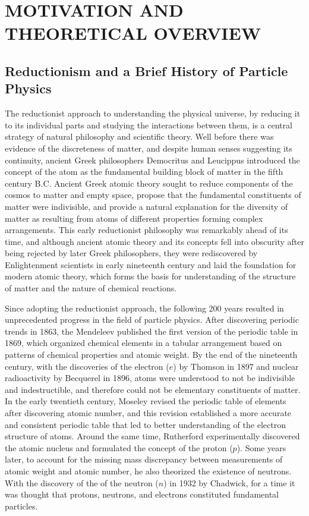 
\chapter{MOTIVATION AND THEORETICAL OVERVIEW}
\label{Motivation_and_Theoretical_Overview}

\section{Reductionism and a Brief History of Particle Physics}
The reductionist approach to understanding the physical universe, by reducing it to its individual parts and studying the interactions between them, is a central strategy of natural philosophy and scientific theory.
Well before there was evidence of the discreteness of matter, and despite human senses suggesting its continuity, ancient Greek philosophers Democritus and Leucippus introduced the concept of the atom as the fundamental building block of matter in the fifth century B.C.
Ancient Greek atomic theory sought to reduce components of the cosmos to matter and empty space, propose that the fundamental constituents of matter were indivisible, and provide a natural explanation for the diversity of matter as resulting from atoms of different properties forming complex arrangements.
This early reductionist philosophy was remarkably ahead of its time, and although ancient atomic theory and its concepts fell into obscurity after being rejected by later Greek philosophers, they were rediscovered by Enlightenment scientists in early nineteenth century and laid the foundation for modern atomic theory, which forms the basis for understanding of the structure of matter and the nature of chemical reactions.

Since adopting the reductionist approach, the following 200 years resulted in unprecedented progress in the field of particle physics.
After discovering periodic trends in 1863, the Mendeleev published the first version of the periodic table in 1869, which organized chemical elements in a tabular arrangement based on patterns of chemical properties and atomic weight.
By the end of the nineteenth century, with the discoveries of the electron ($e$) by Thomson in 1897 and nuclear radioactivity by Becquerel in 1896, atoms were understood to not be indivisible and indestructible, and therefore could not be elementary constituents of matter.
In the early twentieth century, Moseley revised the periodic table of elements after discovering atomic number, and this revision established a more accurate and consistent periodic table that led to better understanding of the electron structure of atoms.
Around the same time, Rutherford experimentally discovered the atomic nucleus and formulated the concept of the proton ($p$).
Some years later, to account for the missing mass discrepancy between measurements of atomic weight and atomic number, he also theorized the existence of neutrons.
With the discovery of the of the neutron ($n$) in 1932 by Chadwick, for a time it was thought that protons, neutrons, and electrons constituted fundamental particles.

